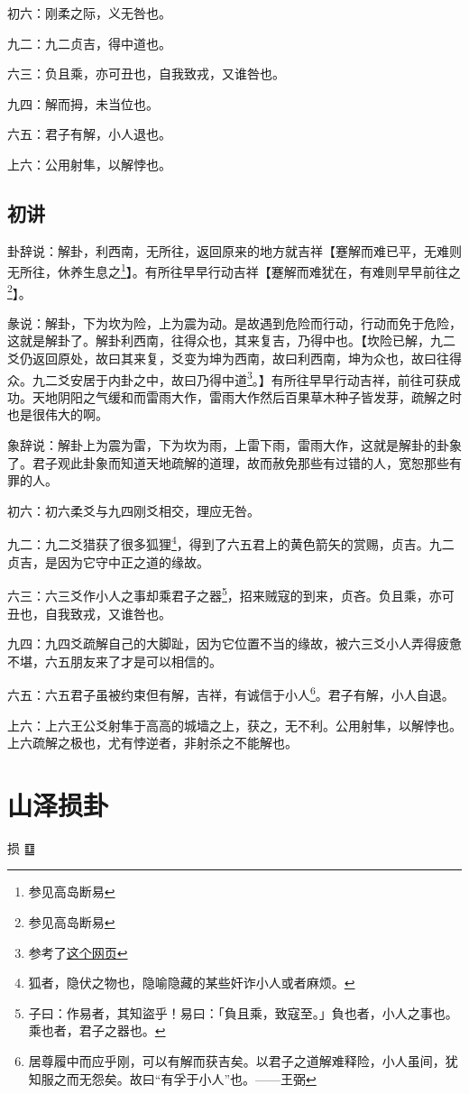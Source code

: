 \documentclass[12pt,oneside]{book}
\begin{document}
初六：刚柔之际，义无咎也。

九二：九二贞吉，得中道也。

六三：负且乘，亦可丑也，自我致戎，又谁咎也。

九四：解而拇，未当位也。

六五：君子有解，小人退也。

上六：公用射隼，以解悖也。

\section{初讲}
卦辞说：解卦，利西南，无所往，返回原来的地方就吉祥【蹇解而难已平，无难则无所往，休养生息之\footnote{参见高岛断易}】。有所往早早行动吉祥【蹇解而难犹在，有难则早早前往之\footnote{参见高岛断易}】。

彖说：解卦，下为坎为险，上为震为动。是故遇到危险而行动，行动而免于危险，这就是解卦了。解卦利西南，往得众也，其来复吉，乃得中也。【坎险已解，九二爻仍返回原处，故曰其来复，爻变为坤为西南，故曰利西南，坤为众也，故曰往得众。九二爻安居于内卦之中，故曰乃得中道\footnote{参考了\href{https://www.eee-learning.com/book/neweee40}{这个网页}}。】有所往早早行动吉祥，前往可获成功。天地阴阳之气缓和而雷雨大作，雷雨大作然后百果草木种子皆发芽，疏解之时也是很伟大的啊。

象辞说：解卦上为震为雷，下为坎为雨，上雷下雨，雷雨大作，这就是解卦的卦象了。君子观此卦象而知道天地疏解的道理，故而赦免那些有过错的人，宽恕那些有罪的人。


初六：初六柔爻与九四刚爻相交，理应无咎。

九二：九二爻猎获了很多狐狸\footnote{狐者，隐伏之物也，隐喻隐藏的某些奸诈小人或者麻烦。}，得到了六五君上的黄色箭矢的赏赐，贞吉。九二贞吉，是因为它守中正之道的缘故。

六三：六三爻作小人之事却乘君子之器\footnote{子曰：作易者，其知盜乎！易曰：「負且乘，致寇至。」負也者，小人之事也。乘也者，君子之器也。}，招来贼寇的到来，贞吝。负且乘，亦可丑也，自我致戎，又谁咎也。

九四：九四爻疏解自己的大脚趾，因为它位置不当的缘故，被六三爻小人弄得疲惫不堪，六五朋友来了才是可以相信的。

六五：六五君子虽被约束但有解，吉祥，有诚信于小人\footnote{居尊履中而应乎刚，可以有解而获吉矣。以君子之道解难释险，小人虽间，犹知服之而无怨矣。故曰“有孚于小人”也。——王弼}。君子有解，小人自退。

上六：上六王公爻射隼于高高的城墙之上，获之，无不利。公用射隼，以解悖也。上六疏解之极也，尤有悖逆者，非射杀之不能解也。


\chapter{山泽损卦}
损 {\Large ䷨}
\end{document}
